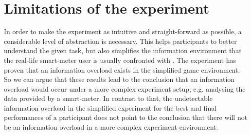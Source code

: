 %
%
%
\section{Limitations of the experiment}
In order to make the experiment as intuitive and straight-forward as possible, a considerable level of abstraction is necessary. This helps participants to better understand the given task, but also simplifies the information environment that the real-life smart-meter user is usually confronted with \citep{Jacoby1984}. The experiment has proven that an information overload exists in the simplified game environment.  So we can argue that these results lead to the conclusion that an information overload would occur under a more complex experiment setup, e.g. analysing the data provided by a smart-meter. 
In contrast to that, the undetectable information overload in the simplified experiment for the best and final performances of a participant does not point to the conclusion that there will not be an information overload in a more complex experiment environment.

